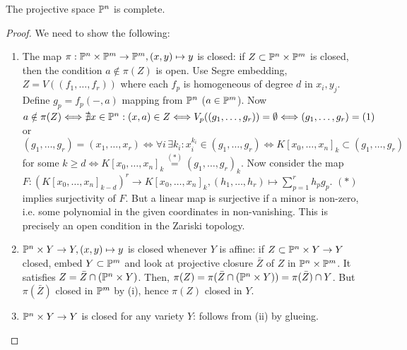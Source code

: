 \documentclass[a4paper,11pt]{article}
\begin{document}
			\begin{prop}\label{prop--proj-complete}
				The projective space $\P^n$ is complete.
			\end{prop}
			\begin{proof} We need to show the following:
				\begin{enumerate}
					\item The map $\pi:\P^n\times \P^m\rightarrow\P^m, (x,y)\mapsto y$ is closed: if $Z\subset\P^n\times\P^m$ is closed, then the condition $a\notin\pi(Z)$ is open. Use Segre embedding, $Z=V((f_1,\dots,f_r))$ where each $f_p$ is homogeneous of degree $d$ in $x_i,y_j$. Define $g_p=f_p(-,a)$ mapping from $\P^n$ ($a\in\P^m$). Now $a\notin\pi(Z)\Longleftrightarrow\nexists x\in\P^n:(x,a)\in Z\Longleftrightarrow V_p((g_1,\dots,g_r))=\emptyset\Longleftrightarrow (g_1,\dots,g_r)=(1)$ or $(g_1,\dots,g_r)=(x_1,\dots,x_r)\Longleftrightarrow\forall i\,\exists k_i: x_i^{k_i}\in(g_1,\dots,g_r)\Longleftrightarrow K[x_0,\dots,x_n]_k\subset(g_1,\dots,g_r)$ for some $k\ge d\Longleftrightarrow K[x_0,\dots,x_n]_k\overset{(\ast)}{=}(g_1,\dots,g_r)_k$. Now consider the map $F:(K[x_0,\dots,x_n]_{k-d})^{r}\rightarrow K[x_0,\dots,x_n]_k,(h_1,\dots,h_r)\mapsto \sum_{p=1}^{r}h_pg_p$. $(\ast)$ implies surjectivity of $F$. But a linear map is surjective if a minor is non-zero, i.e. some polynomial in the given coordinates in non-vanishing. This is precisely an open condition in the Zariski topology.
					\item $\P^n\times Y\rightarrow Y,(x,y)\mapsto y$ is closed whenever $Y$ is affine: if $Z\subset\P^n\times Y\rightarrow Y$ closed, embed $Y\subset\P^m$ and look at projective closure $\bar{Z}$ of $Z$ in $\P^n\times\P^m$. It satisfies $Z=\bar{Z}\cap(\P^n\times Y)$. Then, $\pi(Z)=\pi(\bar{Z}\cap(\P^n\times Y))=\pi(\bar{Z})\cap Y$. But $\pi(\bar{Z})$ closed in $\P^m$ by (i), hence $\pi(Z)$ closed in $Y$.
					\item $\P^n\times Y\rightarrow Y$ is closed for any variety $Y$: follows from (ii) by glueing.
				\end{enumerate}
			\end{proof}
\end{document}
